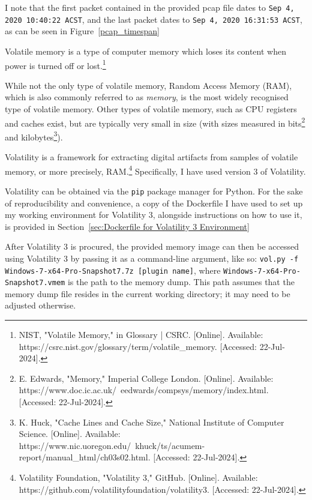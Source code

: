 \begin{myenum}
	\item I note that the first packet contained in the provided pcap file dates to \texttt{Sep 4, 2020 10:40:22 ACST}, and the last packet dates to \texttt{Sep 4, 2020 16:31:53 ACST}, as can be seen in Figure~\ref{pcap_timespan}
	\item Volatile memory is a type of computer memory which loses its content when power is turned off or lost.\footnote{NIST, "Volatile Memory," in Glossary | CSRC. [Online]. Available: https://csrc.nist.gov/glossary/term/volatile\_memory. [Accessed: 22-Jul-2024].} 
	\item While not the only type of volatile memory, Random Access Memory (RAM), which is also commonly referred to as \emph{memory}, is the most widely recognised type of volatile memory. Other types of volatile memory, such as CPU registers and caches exist, but are typically very small in size (with sizes measured in bits\footnote{E. Edwards, "Memory," Imperial College London. [Online]. Available: https://www.doc.ic.ac.uk/~eedwards/compsys/memory/index.html. [Accessed: 22-Jul-2024].} and kilobytes\footnote{K. Huck, "Cache Lines and Cache Size," National Institute of Computer Science. [Online]. Available: https://www.nic.uoregon.edu/~khuck/ts/acumem-report/manual\_html/ch03s02.html. [Accessed: 22-Jul-2024].}).
	\item Volatility is a framework for extracting digital artifacts from samples of volatile memory, or more precisely, RAM.\footnote{Volatility Foundation, "Volatility 3," GitHub. [Online]. Available: https://github.com/volatilityfoundation/volatility3. [Accessed: 22-Jul-2024].} Specifically, I have used version 3 of Volatility.
	\item Volatility can be obtained via the \texttt{pip} package manager for Python. For the sake of reproducibility and convenience, a copy of the Dockerfile I have used to set up my working environment for Volatility 3, alongside instructions on how to use it, is provided in Section~\ref{sec:Dockerfile for Volatility 3 Environment}
	\item After Volatility 3 is procured, the provided memory image can then be accessed using Volatility 3 by passing it as a command-line argument, like so: \texttt{vol.py -f Windows-7-x64-Pro-Snapshot7.7z [plugin name]}, where \texttt{Windows-7-x64-Pro-Snapshot7.vmem} is the path to the memory dump. This path assumes that the memory dump file resides in the current working directory; it may need to be adjusted otherwise.
	\begin{enumerate}

\end{enumerate}
\end{myenum}
